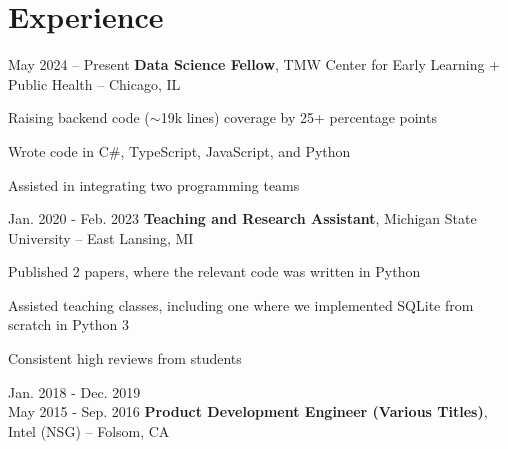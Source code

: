 

	\section{Experience}

	\begin{twocolentry}
		{ May 2024 – Present } \textbf{Data Science Fellow}, TMW Center for Early Learning
		+ Public Health -- Chicago, IL
	\end{twocolentry}

	\vspace{0.10 cm}
	\begin{onecolentry}
		\begin{highlights}
			\item Raising backend code ($\sim$19k lines) coverage by 25+ percentage points
			\item Wrote code in C\#, TypeScript, JavaScript, and Python \item Assisted
			in integrating two programming teams
		\end{highlights}
	\end{onecolentry}

	\vspace{0.2 cm}

	\begin{twocolentry}
		{ Jan. 2020 - Feb. 2023 } \textbf{Teaching and Research Assistant}, Michigan
		State University -- East Lansing, MI
	\end{twocolentry}

	\vspace{0.10 cm}
	\begin{onecolentry}
		\begin{highlights}
			\item Published 2 papers, where the relevant code was written in Python
			\item Assisted teaching classes, including one where we implemented SQLite
			from scratch in Python 3 \item Consistent high reviews from students
		\end{highlights}
	\end{onecolentry}

	\vspace{0.2 cm}

	\begin{twocolentry}
		{ Jan. 2018 - Dec. 2019 \\ May 2015 - Sep. 2016 } \textbf{Product
		Development Engineer (Various Titles)}, Intel (NSG) -- Folsom, CA
	\end{twocolentry}

